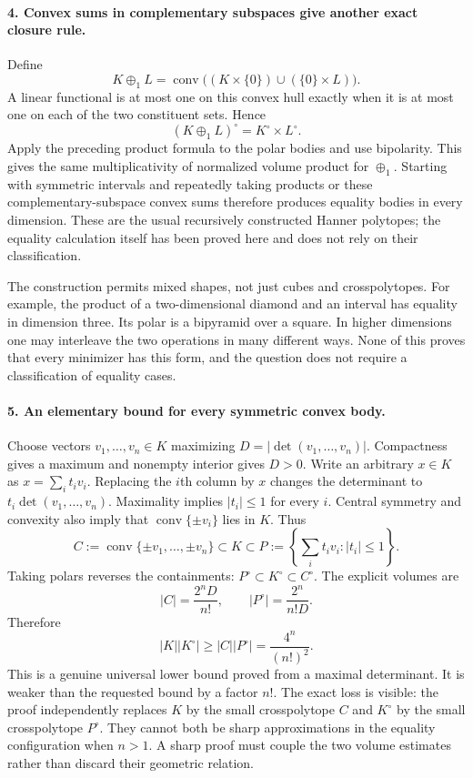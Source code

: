 \documentclass[11pt]{article}
\begin{document}
\paragraph{4. Convex sums in complementary subspaces give another exact closure rule.}
Define
\[
 K\oplus_1 L=\operatorname{conv}\bigl((K\times\{0\})\cup(\{0\}\times L)\bigr).
\]
A linear functional is at most one on this convex hull exactly when it is at most one on each of the two constituent sets. Hence
\[
 (K\oplus_1L)^\circ=K^\circ\times L^\circ.
\]
Apply the preceding product formula to the polar bodies and use bipolarity. This gives the same multiplicativity of normalized volume product for $\oplus_1$. Starting with symmetric intervals and repeatedly taking products or these complementary-subspace convex sums therefore produces equality bodies in every dimension. These are the usual recursively constructed Hanner polytopes; the equality calculation itself has been proved here and does not rely on their classification.

The construction permits mixed shapes, not just cubes and crosspolytopes. For example, the product of a two-dimensional diamond and an interval has equality in dimension three. Its polar is a bipyramid over a square. In higher dimensions one may interleave the two operations in many different ways. None of this proves that every minimizer has this form, and the question does not require a classification of equality cases.

\paragraph{5. An elementary bound for every symmetric convex body.}
Choose vectors $v_1,\ldots,v_n\in K$ maximizing $D=|\det(v_1,\ldots,v_n)|$. Compactness gives a maximum and nonempty interior gives $D>0$. Write an arbitrary $x\in K$ as $x=\sum_i t_iv_i$. Replacing the $i$th column by $x$ changes the determinant to $t_i\det(v_1,\ldots,v_n)$. Maximality implies $|t_i|\leq1$ for every $i$. Central symmetry and convexity also imply that $\operatorname{conv}\{\pm v_i\}$ lies in $K$. Thus
\[
 C:=\operatorname{conv}\{\pm v_1,\ldots,\pm v_n\}
 \subset K\subset P:=\left\{\sum_i t_iv_i:|t_i|\leq1\right\}.
\]
Taking polars reverses the containments: $P^\circ\subset K^\circ\subset C^\circ$. The explicit volumes are
\[
 |C|=\frac{2^nD}{n!},\qquad |P^\circ|=\frac{2^n}{n!D}.
\]
Therefore
\[
 |K||K^\circ|\geq |C||P^\circ|=\frac{4^n}{(n!)^2}.
\]
This is a genuine universal lower bound proved from a maximal determinant. It is weaker than the requested bound by a factor $n!$. The exact loss is visible: the proof independently replaces $K$ by the small crosspolytope $C$ and $K^\circ$ by the small crosspolytope $P^\circ$. They cannot both be sharp approximations in the equality configuration when $n>1$. A sharp proof must couple the two volume estimates rather than discard their geometric relation.
\end{document}
